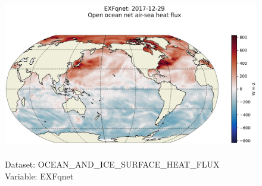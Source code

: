 \begin{figure}[H]
\centering
\includegraphics[scale=0.5]{../images/plots/latlon_plots/Ocean_and_Sea-Ice_Surface_Heat_Fluxes/EXFqnet.png}
\caption{\\Dataset: OCEAN\_AND\_ICE\_SURFACE\_HEAT\_FLUX\\Variable: EXFqnet}
\label{tab:table-OCEAN_AND_ICE_SURFACE_HEAT_FLUX_EXFqnet-Plot}
\end{figure}
\pagebreak
